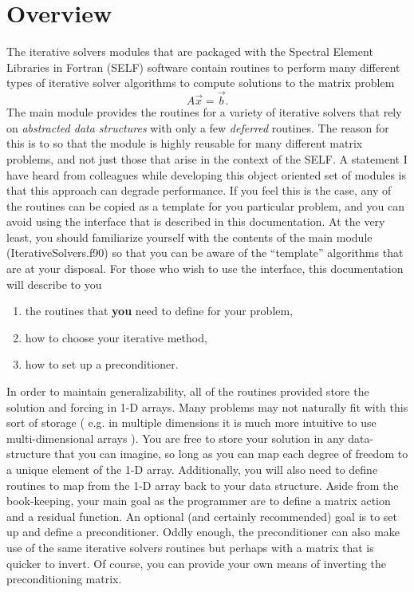 \documentclass[12pt]{memoir}
\begin{document}
\chapter{Overview}
 The iterative solvers modules that are packaged with the Spectral Element Libraries in Fortran (SELF) software contain routines to perform many different types of iterative solver algorithms to compute solutions to the matrix problem
 \begin{equation}
 A \vec{x} = \vec{b}.
 \end{equation}
 The main module provides the routines for a variety of iterative solvers that rely on \textit{abstracted data structures} with only a few \textit{deferred} routines. The reason for this is to so that the module is highly reusable for many different matrix problems, and not just those that arise in the context of the SELF. A statement I have heard from colleagues while developing this object oriented set of modules is that this approach can degrade performance. If you feel this is the case, any of the routines can be copied as a template for you particular problem, and you can avoid using the interface that is described in this documentation. At the very least, you should familiarize yourself with the contents of the main module (IterativeSolvers.f90) so that you can be aware of the ``template'' algorithms that are at your disposal. For those who wish to use the interface, this documentation will describe to you 
 \begin{enumerate}
  \item the routines that \textbf{you} need to define for your problem,
  \item how to choose your iterative method,
  \item how to set up a preconditioner.
 \end{enumerate}
 
 In order to maintain generalizability, all of the routines provided store the solution and forcing in 1-D arrays. Many problems may not naturally fit with this sort of storage ( e.g. in multiple dimensions it is much more intuitive to use multi-dimensional arrays ). You are free to store your solution in any data-structure that you can imagine, so long as you can map each degree of freedom to a unique element of the 1-D array. Additionally, you will also need to define routines to map from the 1-D array back to your data structure. Aside from the book-keeping, your main goal as the programmer are to define a matrix action and a residual function. An optional (and certainly recommended) goal is to set up and define a preconditioner. Oddly enough, the preconditioner can also make use of the same iterative solvers routines but perhaps with a matrix that is quicker to invert. Of course, you can provide your own means of inverting the preconditioning matrix.
 
\end{document}
